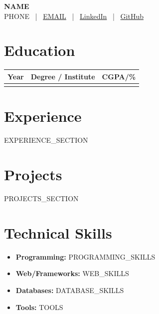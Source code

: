 \documentclass[a4paper,11pt]{article}
\begin{document}
\begin{center}
    {\Huge \textbf{{{NAME}}}} \\[6pt]
    {{PHONE}} \, | \,
    \href{mailto:{{EMAIL}}}{{{EMAIL}}} \, | \,
    \href{https://linkedin.com/in/{{LINKEDIN}}}{LinkedIn} \, | \,
    \href{https://github.com/{{GITHUB}}}{GitHub}
\end{center}

\vspace{-2mm}

\section{Education}
\begin{tabularx}{\textwidth}{|>{\centering\arraybackslash}p{2.5cm}|X|>{\centering\arraybackslash}p{2cm}|}
\hline
\textbf{Year} & \textbf{Degree / Institute} & \textbf{CGPA/\%} \\
\hline
{{EDUCATION_ROWS}}
\hline
\end{tabularx}

\vspace{3mm}

\section{Experience}
\begin{itemize}[leftmargin=*]
{{EXPERIENCE_SECTION}}
\end{itemize}

\section{Projects}
\begin{itemize}[leftmargin=*]
{{PROJECTS_SECTION}}
\end{itemize}

\section{Technical Skills}
\begin{itemize}[leftmargin=*]
\item \textbf{Programming:} {{PROGRAMMING_SKILLS}}
\item \textbf{Web/Frameworks:} {{WEB_SKILLS}}
\item \textbf{Databases:} {{DATABASE_SKILLS}}
\item \textbf{Tools:} {{TOOLS}}
\end{itemize}
\end{document}
